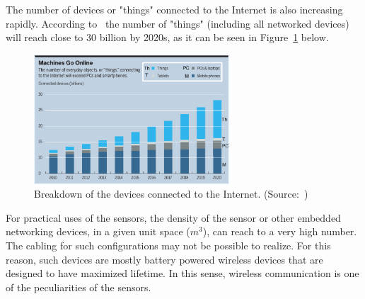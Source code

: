 \documentclass[12pt, oneandhalf, chaparabic, sees, ms]{metu}
\begin{document}
The number of devices or "things" connected to the Internet is also increasing rapidly. According to~\cite{regalado2014} the number of "things" 
(including all networked devices) will reach close to 30 billion by 2020s, as it can be seen in Figure~\ref{fig:mit-iot-forecast} below.
% 
%
%
\begin{figure}[!htbp]
\begin{center}
  \includegraphics[width=0.65\textwidth]{mit-iot-forecast2.png}
   \end{center}
  \caption{Breakdown of the devices connected to the Internet. (Source:~\protect\cite{regalado2014})}
 \label{fig:mit-iot-forecast}
\end{figure}
% 
%
%
For practical uses of the sensors, the density of the sensor or other embedded networking devices, in a given unit space ($m^3$), 
can reach to a very high number. 
The cabling for such configurations may not be possible to realize. For this reason, such devices are mostly battery powered wireless devices 
that are designed to have maximized lifetime. 
In this sense, wireless communication is one of the peculiarities of the sensors.
\end{document}
